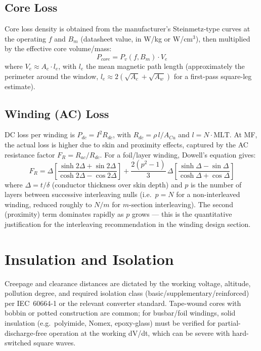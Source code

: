 \documentclass[11pt,a4paper]{article}
\begin{document}
\subsection*{Core Loss}
Core loss density is obtained from the manufacturer's Steinmetz-type curves at
the operating $f$ and $B_m$ (datasheet value, in W/kg or W/cm$^3$), then
multiplied by the effective core volume/mass:
\begin{equation}
    P_{core} = P_v(f,B_m)\cdot V_e
\end{equation}
where $V_e \approx A_c \cdot l_e$, with $l_e$ the mean magnetic path length
(approximately the perimeter around the window, $l_e \approx 2(\sqrt{A_c}+\sqrt{A_w})$
for a first-pass square-leg estimate).

\subsection*{Winding (AC) Loss}
DC loss per winding is $P_{dc}=I^2 R_{dc}$, with $R_{dc}=\rho\, l/A_{Cu}$ and
$l=N\cdot\mathrm{MLT}$. At MF, the actual loss is higher due to skin and
proximity effects, captured by the AC resistance factor $F_R=R_{ac}/R_{dc}$.
For a foil/layer winding, Dowell's equation\cite{dowell} gives:
\begin{equation}
    F_R = \Delta\left[\frac{\sinh2\Delta+\sin2\Delta}{\cosh2\Delta-\cos2\Delta}\right]
    + \frac{2(p^2-1)}{3}\,\Delta\left[\frac{\sinh\Delta-\sin\Delta}{\cosh\Delta+\cos\Delta}\right]
\end{equation}
where $\Delta = t/\delta$ (conductor thickness over skin depth) and $p$ is the
number of layers between successive interleaving nulls (i.e.\ $p=N$ for a
non-interleaved winding, reduced roughly to $N/m$ for $m$-section interleaving).
The second (proximity) term dominates rapidly as $p$ grows — this is the
quantitative justification for the interleaving recommendation in the winding
design section.

\section{Insulation and Isolation}
Creepage and clearance distances are dictated by the working voltage, altitude,
pollution degree, and required isolation class (basic/supplementary/reinforced)
per IEC~60664-1 or the relevant converter standard. Tape-wound cores with bobbin
or potted construction are common; for busbar/foil windings, solid insulation
(e.g.\ polyimide, Nomex, epoxy-glass) must be verified for partial-discharge-free
operation at the working dV/dt, which can be severe with hard-switched square waves.
\end{document}
